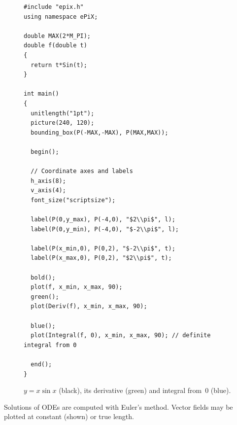 \documentclass[11pt]{article}
\begin{document}
\begin{figure}[hbt]
\begin{center}

\vspace*{-120pt}
\begin{small}
\begin{verbatim}
#include "epix.h"
using namespace ePiX;

double MAX(2*M_PI);
double f(double t)
{
  return t*Sin(t);
}

int main()
{
  unitlength("1pt");
  picture(240, 120);
  bounding_box(P(-MAX,-MAX), P(MAX,MAX));

  begin();

  // Coordinate axes and labels
  h_axis(8);
  v_axis(4);
  font_size("scriptsize");

  label(P(0,y_max), P(-4,0), "$2\\pi$", l);
  label(P(0,y_min), P(-4,0), "$-2\\pi$", l);

  label(P(x_min,0), P(0,2), "$-2\\pi$", t);
  label(P(x_max,0), P(0,2), "$2\\pi$", t);

  bold();
  plot(f, x_min, x_max, 90);
  green();
  plot(Deriv(f), x_min, x_max, 90);

  blue();
  plot(Integral(f, 0), x_min, x_max, 90); // definite integral from 0

  end();
}
\end{verbatim}
\end{small}
\caption{$y=x\sin x$ (black), its derivative (green) and integral from~$0$
(blue).}
\label{fig:calculus}
\end{center}
\end{figure}

\clearpage

\noindent Solutions of ODEs are computed with Euler's method. Vector 
fields may be plotted at constant (shown) or true length.
\end{document}
